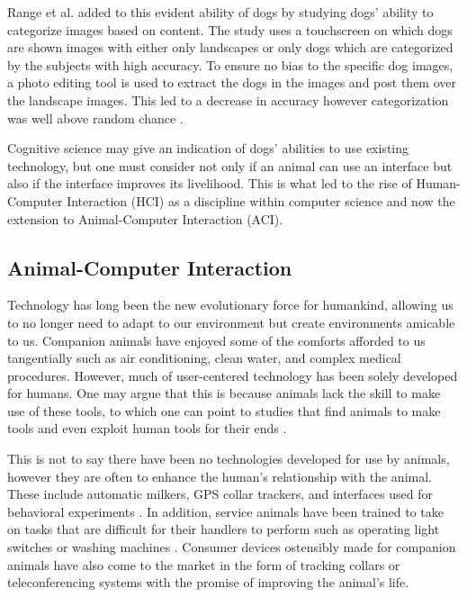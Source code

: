 \documentclass[conference]{IEEEtran}
\begin{document}
        Range et al. added to this evident ability of dogs by studying dogs’ ability to categorize images based on content. The study uses a touchscreen on which dogs are shown images with either only landscapes or only dogs which are categorized by the subjects with high accuracy. To ensure no bias to the specific dog images, a photo editing tool is used to extract the dogs in the images and post them over the landscape images. This led to a decrease in accuracy however categorization was well above random chance \cite{Range2008}.
        
        Cognitive science may give an indication of dogs’ abilities to use existing technology, but one must consider not only if an animal can use an interface but also if the interface improves its livelihood. This is what led to the rise of Human-Computer Interaction (HCI) as a discipline within computer science and now the extension to Animal-Computer Interaction (ACI).

    \subsection{Animal-Computer Interaction}
        Technology has long been the new evolutionary force for humankind, allowing us to no longer need to adapt to our environment but create environments amicable to us. Companion animals have enjoyed some of the comforts afforded to us tangentially such as air conditioning, clean water, and complex medical procedures. However, much of user-centered technology has been solely developed for humans. One may argue that this is because animals lack the skill to make use of these tools, to which one can point to studies that find animals to make tools and even exploit human tools for their ends \cite{Hunt2004}.
        
        This is not to say there have been no technologies developed for use by animals, however they are often to enhance the human’s relationship with the animal. These include automatic milkers, GPS collar trackers, and interfaces used for behavioral experiments \cite{Epstein2000,Garton2001}. In addition, service animals have been trained to take on tasks that are difficult for their handlers to perform such as operating light switches or washing machines \cite{Mancini2017a}. Consumer devices ostensibly made for companion animals have also come to the market in the form of tracking collars or teleconferencing systems with the promise of improving the animal’s life.
        
\end{document}
